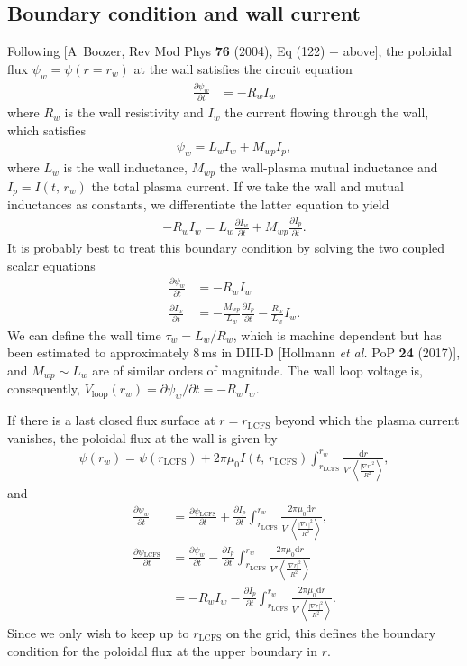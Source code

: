 \documentclass[11pt,a4paper]{article}
\newcommand{\rd}{\ensuremath{\mathrm{d}}}
\newcommand{\sub}[1]{\ensuremath{_{\text{#1}}}}
\begin{document}
\subsection{Boundary condition and wall current}
Following [A~Boozer, Rev Mod Phys {\bf 76} (2004), Eq (122) + above], the poloidal flux $\psi_w = \psi(r=r_w)$ at the wall satisfies the circuit equation
\begin{align}
\frac{\partial \psi_w}{\partial t} &= -R_w I_w
\end{align}
where $R_w$ is the wall resistivity and $I_w$ the current flowing through the wall, which satisfies
\begin{align}
\psi_w = L_w I_w + M_{wp}I_p,
\end{align}
where $L_w$ is the wall inductance, $M_{wp}$ the wall-plasma mutual inductance and $I_p = I(t,\,r_w)$ the total plasma current. If we take the wall and mutual inductances as constants, we differentiate the latter equation to yield
\begin{align}
-R_w I_w = L_w \frac{\partial I_w}{\partial t} + M_{wp}\frac{\partial I_p}{\partial t}.
\end{align}
It is probably best to treat this boundary condition by solving the two coupled scalar equations
\begin{align}
\frac{\partial \psi_w}{\partial t} &= -R_w I_w \nonumber \\
 \frac{\partial I_w}{\partial t} &= -\frac{ M_{wp}}{L_w}\frac{\partial I_p}{\partial t} -\frac{R_w}{L_w} I_w .
\end{align}
We can define the wall time $\tau_w = L_w/R_w$, which is machine dependent but has been estimated to approximately 8\,ms in DIII-D [Hollmann \emph{et al.} PoP {\bf 24} (2017)], and $M_{wp} \sim L_w$ are of similar orders of magnitude. The wall loop voltage is, consequently, $V\sub{loop}(r_w) = \partial \psi_w/\partial t = -R_w I_w$.

If there is a last closed flux surface at $r=r\sub{LCFS}$ beyond which the plasma current vanishes, the poloidal flux at the wall is given by
\begin{align}
\psi(r_w) = \psi(r\sub{LCFS}) + 2\pi\mu_0 I(t,\,r\sub{LCFS})\int_{r\sub{LCFS}}^{r_w}\frac{\rd r}{V'\left\langle\frac{|\nabla r|^2}{R^2}\right\rangle},
\end{align}
and
\begin{align}
\frac{\partial \psi_w}{\partial t} &= \frac{\partial \psi\sub{LCFS}}{\partial t} + \frac{\partial I_p}{\partial t}\int_{r\sub{LCFS}}^{r_w}\frac{2\pi \mu_0 \rd r}{V'\left\langle\frac{|\nabla r|^2}{R^2}\right\rangle}, \nonumber \\
 \frac{\partial \psi\sub{LCFS}}{\partial t} &= \frac{\partial \psi_w}{\partial t} -\frac{\partial I_p}{\partial t}\int_{r\sub{LCFS}}^{r_w}\frac{2\pi \mu_0 \rd r}{V'\left\langle\frac{|\nabla r|^2}{R^2}\right\rangle} \nonumber \\
 &= - R_w I_w - \frac{\partial I_p}{\partial t}\int_{r\sub{LCFS}}^{r_w}\frac{2\pi \mu_0 \rd r}{V'\left\langle\frac{|\nabla r|^2}{R^2}\right\rangle} .
\end{align}
Since we only wish to keep up to $r\sub{LCFS}$ on the grid, this defines the boundary condition for the poloidal flux at the upper boundary in $r$.
\end{document}
